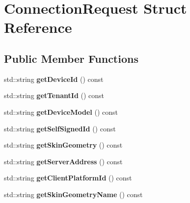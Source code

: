 \hypertarget{struct_connection_request}{}\section{Connection\+Request Struct Reference}
\label{struct_connection_request}
\subsection*{Public Member Functions}
\begin{DoxyCompactItemize}
\item 
\mbox{\label{struct_connection_request_afa99af52c945e1cc50d1d8d6df68c527}} 
std\+::string {\bfseries get\+Device\+Id} () const
\item 
\mbox{\label{struct_connection_request_aa516172c5206e8aaa1bbabe9cbaf3296}} 
std\+::string {\bfseries get\+Tenant\+Id} () const
\item 
\mbox{\label{struct_connection_request_a08db28bf99a034c5dd0df6dc314f3581}} 
std\+::string {\bfseries get\+Device\+Model} () const
\item 
\mbox{\label{struct_connection_request_aa185452f881bd96b46f790bb25e137f6}} 
std\+::string {\bfseries get\+Self\+Signed\+Id} () const
\item 
\mbox{\label{struct_connection_request_afe2d34aa89a32e601954c8b1d91cf46d}} 
std\+::string {\bfseries get\+Skin\+Geometry} () const
\item 
\mbox{\label{struct_connection_request_a5bea81ab7ed678d5b8368f6191d8a7ac}} 
std\+::string {\bfseries get\+Server\+Address} () const
\item 
\mbox{\label{struct_connection_request_a4b5edd0e68cd942c9a1d8cca7138deea}} 
std\+::string {\bfseries get\+Client\+Platform\+Id} () const
\item 
\mbox{\label{struct_connection_request_a350d420aee3da314ff6d4b717f735b9c}} 
std\+::string {\bfseries get\+Skin\+Geometry\+Name} () const

\end{DoxyCompactItemize}
